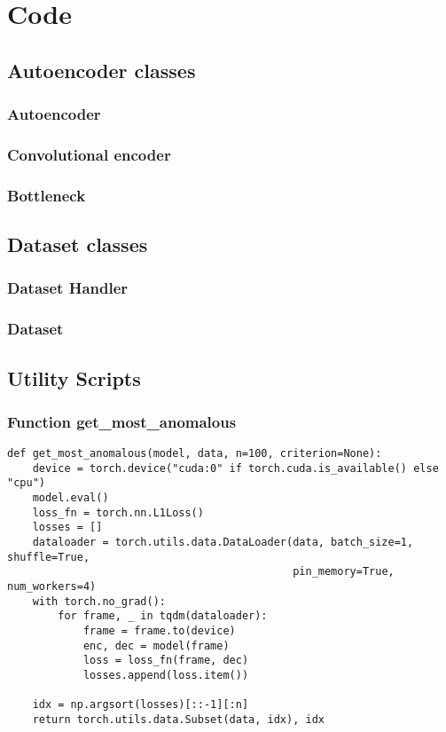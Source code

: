 \chapter{Code}
\label{chap:code}

\section{Autoencoder classes}
\subsection{Autoencoder}


\subsection{Convolutional encoder}


\subsection{Bottleneck}


\section{Dataset classes}
\subsection{Dataset Handler}

\subsection{Dataset}


\section{Utility Scripts}
\subsection{Function get_most_anomalous}
\lstset{language=python}
\begin{lstlisting}
def get_most_anomalous(model, data, n=100, criterion=None):
    device = torch.device("cuda:0" if torch.cuda.is_available() else "cpu")
    model.eval()
    loss_fn = torch.nn.L1Loss()
    losses = []
    dataloader = torch.utils.data.DataLoader(data, batch_size=1, shuffle=True,
                                             pin_memory=True, num_workers=4)
    with torch.no_grad():
        for frame, _ in tqdm(dataloader):
            frame = frame.to(device)
            enc, dec = model(frame)
            loss = loss_fn(frame, dec)
            losses.append(loss.item())

    idx = np.argsort(losses)[::-1][:n]
    return torch.utils.data.Subset(data, idx), idx
\end{lstlisting}

